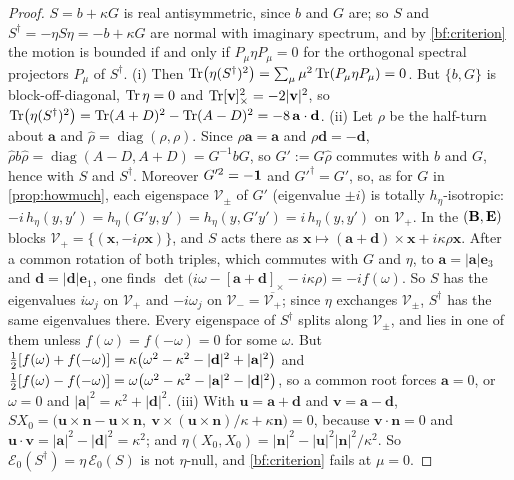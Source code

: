 \begin{proof}
$S=b+\kappa G$ is real antisymmetric, since $b$ and $G$ are; so $S$ and $S^\dagger=-\eta S\eta=-b+\kappa G$ are normal with imaginary spectrum, and
by \cref{bf:criterion} the motion is bounded if and only if $P_\mu\eta P_\mu=0$ for the orthogonal spectral projectors $P_\mu$ of $S^\dagger$.
(i) Then $\operatorname{Tr}\bigl(\eta(S^\dagger)^2\bigr)=\sum_\mu\mu^2\operatorname{Tr}(P_\mu\eta P_\mu)=0$. But $\{b,G\}$ is block-off-diagonal, $\operatorname{Tr}\eta=0$ and
$\operatorname{Tr}[\mathbf v]_\times^2=-2|\mathbf v|^2$, so $\operatorname{Tr}\bigl(\eta(S^\dagger)^2\bigr)=\operatorname{Tr}(A+D)^2-\operatorname{Tr}(A-D)^2=-8\,\mathbf a\cdot\mathbf d$.
(ii) Let $\rho$ be the half-turn about $\mathbf a$ and $\hat\rho=\operatorname{diag}(\rho,\rho)$. Since $\rho\mathbf a=\mathbf a$ and $\rho\mathbf d=-\mathbf d$,
$\hat\rho b\hat\rho=\operatorname{diag}(A-D,A+D)=G^{-1}bG$, so $G':=G\hat\rho$ commutes with $b$ and $G$, hence with $S$ and $S^\dagger$. Moreover
$G'^2=-\mathbf 1$ and $G'^\dagger=G'$, so, as for $G$ in \cref{prop:howmuch}, each eigenspace $\mathcal V_\pm$ of $G'$ (eigenvalue $\pm i$) is totally
$h_\eta$-isotropic: $-i\,h_\eta(y,y')=h_\eta(G'y,y')=h_\eta(y,G'y')=i\,h_\eta(y,y')$ on $\mathcal V_+$. In the $(\mathbf B,\mathbf E)$ blocks
$\mathcal V_+=\{(\mathbf x,-i\rho\mathbf x)\}$, and $S$ acts there as $\mathbf x\mapsto(\mathbf a+\mathbf d)\times\mathbf x+i\kappa\rho\mathbf x$. After a
common rotation of both triples, which commutes with $G$ and $\eta$, to $\mathbf a=|\mathbf a|\mathbf e_3$ and $\mathbf d=|\mathbf d|\mathbf e_1$, one finds
$\det\bigl(i\omega-[\mathbf a+\mathbf d]_\times-i\kappa\rho\bigr)=-i f(\omega)$. So $S$ has the eigenvalues $i\omega_j$ on $\mathcal V_+$ and $-i\omega_j$ on
$\mathcal V_-=\overline{\mathcal V_+}$; since $\eta$ exchanges $\mathcal V_\pm$, $S^\dagger$ has the same eigenvalues there. Every eigenspace of $S^\dagger$
splits along $\mathcal V_\pm$, and lies in one of them unless $f(\omega)=f(-\omega)=0$ for some $\omega$. But
$\tfrac12[f(\omega)+f(-\omega)]=\kappa\bigl(\omega^2-\kappa^2-|\mathbf d|^2+|\mathbf a|^2\bigr)$ and
$\tfrac12[f(\omega)-f(-\omega)]=\omega\bigl(\omega^2-\kappa^2-|\mathbf a|^2-|\mathbf d|^2\bigr)$, so a common root forces $\mathbf a=0$, or $\omega=0$ and
$|\mathbf a|^2=\kappa^2+|\mathbf d|^2$. (iii) With $\mathbf u=\mathbf a+\mathbf d$ and $\mathbf v=\mathbf a-\mathbf d$,
$SX_0=\bigl(\mathbf u\times\mathbf n-\mathbf u\times\mathbf n,\ \mathbf v\times(\mathbf u\times\mathbf n)/\kappa+\kappa\mathbf n\bigr)=0$, because
$\mathbf v\cdot\mathbf n=0$ and $\mathbf u\cdot\mathbf v=|\mathbf a|^2-|\mathbf d|^2=\kappa^2$; and $\eta(X_0,X_0)=|\mathbf n|^2-|\mathbf u|^2|\mathbf n|^2/\kappa^2$.
So $\mathcal E_0(S^\dagger)=\eta\,\mathcal E_0(S)$ is not $\eta$-null, and \cref{bf:criterion} fails at $\mu=0$.
\end{proof}

